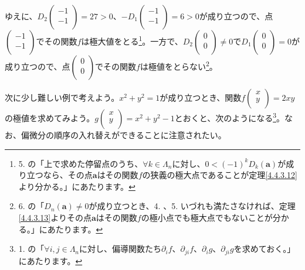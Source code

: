 \documentclass[dvipdfmx]{jsarticle}
\begin{document}
ゆえに、$D_{2}\begin{pmatrix}
 - 1 \\
 - 1 \\
\end{pmatrix} = 27 > 0$、$- D_{1}\begin{pmatrix}
 - 1 \\
 - 1 \\
\end{pmatrix} = 6 > 0$が成り立つので、点$\begin{pmatrix}
 - 1 \\
 - 1 \\
\end{pmatrix}$でその関数$f$は極大値をとる\footnote{5. の「上で求めた停留点のうち、$\forall k \in \varLambda_{n}$に対し、$0 < ( - 1)^{k}D_{k}\left( \mathbf{a} \right)$が成り立つなら、その点$\mathbf{a}$はその関数$f$の狭義の極大点であることが定理\ref{4.4.3.12}より分かる。」にあたります。}。一方で、$D_{2}\begin{pmatrix}
0 \\
0 \\
\end{pmatrix} \neq 0$で$D_{1}\begin{pmatrix}
0 \\
0 \\
\end{pmatrix} = 0$が成り立つので、点$\begin{pmatrix}
0 \\
0 \\
\end{pmatrix}$でその関数$f$は極値をとらない\footnote{6. の「$D_{n}\left( \mathbf{a} \right) \neq 0$が成り立つとき、4. 、5. いづれも満たさなければ、定理\ref{4.4.3.13}よりその点$\mathbf{a}$はその関数$f$の極小点でも極大点でもないことが分かる。」にあたります。}。\par
次に少し難しい例で考えよう。$x^{2} + y^{2} = 1$が成り立つとき、関数$f\begin{pmatrix}
x \\
y \\
\end{pmatrix} = 2xy$の極値を求めてみよう。$g\begin{pmatrix}
x \\
y \\
\end{pmatrix} = x^{2} + y^{2} - 1$とおくと、次のようになる\footnote{1. の「$\forall i,j \in \varLambda_{n}$に対し、偏導関数たち$\partial_{i}f$、$\partial_{ji}f$、$\partial_{i}g$、$\partial_{ji}g$を求めておく。」にあたります。}。なお、偏微分の順序の入れ替えができることに注意されたい。
\end{document}
